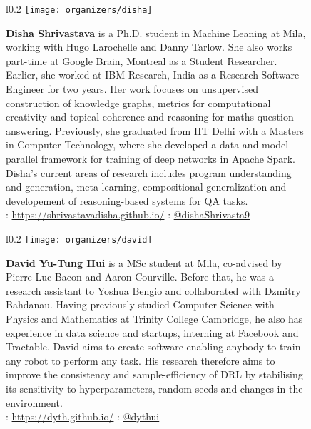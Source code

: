 \documentclass{article}
\begin{document}
    \begin{figure}[H]
        \begin{wrapfigure}{l}{0.2\textwidth}
            \texttt{[image: organizers/disha]}
        \end{wrapfigure}\textbf{Disha Shrivastava} is a Ph.D. student in Machine Leaning at Mila, working with Hugo Larochelle and Danny Tarlow. She also works part-time at Google Brain, Montreal as a Student Researcher. Earlier, she worked at IBM Research, India as a Research Software Engineer for two years. Her work focuses on unsupervised construction of knowledge graphs, metrics for computational creativity and topical coherence and reasoning for maths question-answering. Previously, she graduated from IIT Delhi with a Masters in Computer Technology, where she developed a data and model-parallel framework for training of deep networks in Apache Spark. Disha's current areas of research includes program understanding and generation, meta-learning, compositional generalization and developement of reasoning-based systems for QA tasks.\\
        \faHome: \url{https://shrivastavadisha.github.io/} \faTwitter: \href{https://twitter.com/dishaShrivasta9}{@dishaShrivasta9}
    \end{figure}

    \begin{figure}[H]
        \begin{wrapfigure}{l}{0.2\textwidth}
            \texttt{[image: organizers/david]}
        \end{wrapfigure}\textbf{David Yu-Tung Hui} is a MSc student at Mila, co-advised by Pierre-Luc Bacon and Aaron Courville. Before that, he was a research assistant to Yoshua Bengio and collaborated with Dzmitry Bahdanau. Having previously studied Computer Science with Physics and Mathematics at Trinity College Cambridge, he also has experience in data science and startups, interning at Facebook and Tractable. David aims to create software enabling anybody to train any robot to perform any task. His research therefore aims to improve the consistency and sample-efficiency of DRL by stabilising its sensitivity to hyperparameters, random seeds and changes in the environment.\\
        \faHome: \url{https://dyth.github.io/} \faTwitter: \href{https://twitter.com/dythui}{@dythui}
    \end{figure}
\end{document}
